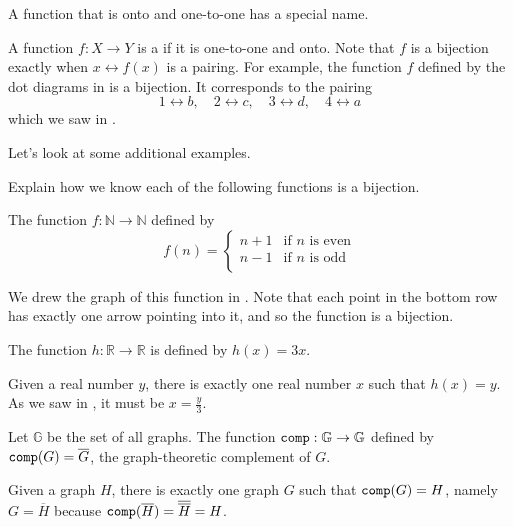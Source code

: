 A function that is onto and one-to-one has a special name.

\begin{defn}[Bijection]
\label{defn_bijection}
    A function $f: X \to Y$ is a  if it is one-to-one and onto.  Note that $f$ is a bijection exactly when $x \leftrightarrow f(x)$ is a pairing.  For example, the function $f$ defined by the dot diagrams in  is a bijection. It corresponds to the pairing 
        $$1 \leftrightarrow b, \quad 2 \leftrightarrow c, \quad 3 \leftrightarrow d, \quad 4 \leftrightarrow a$$
    which we saw in .
\end{defn}

Let's look at some additional examples.

\begin{exam}
\label{exam_bijections}
    Explain how we know each of the following functions is a bijection.
    \begin{apart}
        \item The function $f: \mathbb{N} \to \mathbb{N}$ defined by 
            $$f(n) = \left\{ \begin{array} {cl} 
                n+1 & \text{if }n\text{ is even} \\
                n-1 & \text{if }n\text{ is odd} \\
            \end{array} \right.$$
                \begin{soln}
                    We drew the graph of this function in .  Note that each point in the bottom row has exactly one arrow pointing into it, and so the function is a bijection.
                \end{soln}
        \item \label{part_bijection_RtoR} The function $h: \mathbb{R} \to \mathbb{R}$ is defined by $h(x) = 3x$.
            \begin{soln}
                Given a real number $y$, there is exactly one real number $x$ such that $h(x)=y$.  As we saw in , it must be $x = \frac{y}{3}$.
            \end{soln}
        \item \label{part_graph_comp_bijection} Let $\mathbb{G}$ be the set of all graphs. The function $\texttt{comp}: \mathbb{G} \to \mathbb{G}$ defined by $\texttt{comp}(G)= \overline{G}$, the graph-theoretic complement of $G$. 
            \begin{soln}
                Given a graph $H$, there is exactly one graph $G$ such that $\texttt{comp}(G) = H$, namely $G =\overline{H}$ because $\texttt{comp}(\overline{H}) = \overline{\overline{H}}=H$.
            \end{soln}
    \end{apart}
\end{exam}

